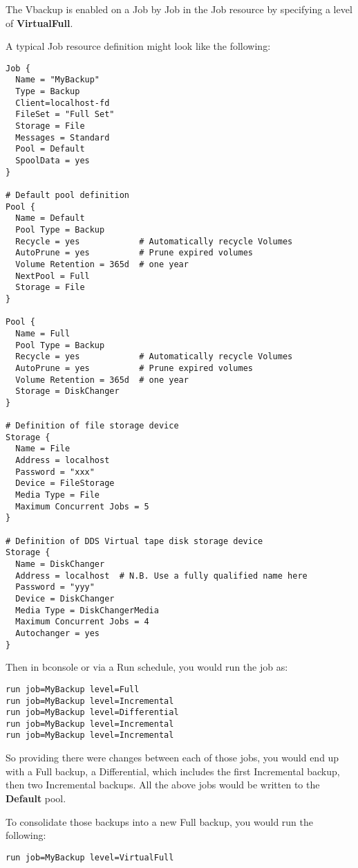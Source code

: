 The Vbackup is enabled on a Job by Job in the Job resource by specifying
a level of {\bf VirtualFull}.

A typical Job resource definition might look like the following:

\begin{verbatim}
Job {
  Name = "MyBackup"
  Type = Backup
  Client=localhost-fd
  FileSet = "Full Set"
  Storage = File
  Messages = Standard
  Pool = Default
  SpoolData = yes
}

# Default pool definition
Pool {
  Name = Default
  Pool Type = Backup
  Recycle = yes            # Automatically recycle Volumes
  AutoPrune = yes          # Prune expired volumes
  Volume Retention = 365d  # one year
  NextPool = Full
  Storage = File
}

Pool {
  Name = Full
  Pool Type = Backup
  Recycle = yes            # Automatically recycle Volumes
  AutoPrune = yes          # Prune expired volumes
  Volume Retention = 365d  # one year
  Storage = DiskChanger
}

# Definition of file storage device
Storage {
  Name = File
  Address = localhost
  Password = "xxx"
  Device = FileStorage
  Media Type = File
  Maximum Concurrent Jobs = 5
}

# Definition of DDS Virtual tape disk storage device
Storage {
  Name = DiskChanger
  Address = localhost  # N.B. Use a fully qualified name here
  Password = "yyy"
  Device = DiskChanger
  Media Type = DiskChangerMedia
  Maximum Concurrent Jobs = 4
  Autochanger = yes
}
\end{verbatim}

Then in bconsole or via a Run schedule, you would run the job as:

\begin{verbatim}
run job=MyBackup level=Full
run job=MyBackup level=Incremental
run job=MyBackup level=Differential
run job=MyBackup level=Incremental
run job=MyBackup level=Incremental
\end{verbatim}

So providing there were changes between each of those jobs, you would end up
with a Full backup, a Differential, which includes the first Incremental
backup, then two Incremental backups.  All the above jobs would be written to
the {\bf Default} pool.

To consolidate those backups into a new Full backup, you would run the
following:

\begin{verbatim}
run job=MyBackup level=VirtualFull
\end{verbatim}

